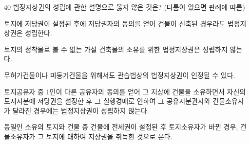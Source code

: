 \begin{question}{40}
법정지상권의 성립에 관한 설명으로 옳지 않은 것은? (다툼이 있으면 판례에 따름)
\begin{choices}
  \item 토지에 저당권이 설정된 후에 저당권자의 동의를 얻어 건물이 신축된 경우라도 법정지상권은 성립한다.
  \item 토지의 정착물로 볼 수 없는 가설 건축물의 소유를 위한 법정지상권은 성립하지 않는다.
  \item 무허가건물이나 미등기건물을 위해서도 관습법상의 법정지상권이 인정될 수 있다.
  \item 토지공유자 중 1인이 다른 공유자의 동의를 얻어 그 지상에 건물을 소유하면서 자신의 토지지분에 저당권을 설정한 후 그 실행경매로 인하여 그 공유지분권자와 건물소유자가 달라진 경우에는 법정지상권이 성립하지 않는다.
  \item 동일인 소유의 토지와 건물 중 건물에 전세권이 설정된 후 토지소유자가 바뀐 경우, 건물소유자가 그 토지에 대하여 지상권을 취득한 것으로 본다.
\end{choices}
\end{question}
